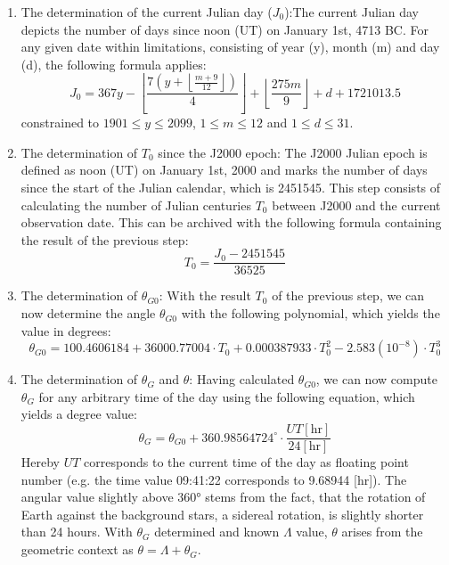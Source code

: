 \documentclass[11pt,a4paper]{article}
\begin{document}
	\begin{enumerate}
		\item The determination of the current Julian day ($J_0$):\newline The current Julian day depicts the number of days since noon (UT) on January 1st, 4713 BC. For any given date within limitations, consisting of year (y), month (m) and day (d), the following formula applies:
		\begin{equation}
			J_0 = 367y - \left\lfloor
			\frac{7\left(y + \left\lfloor \frac{m+9}{12} \right\rfloor\right)}{4}
			\right\rfloor + \left\lfloor \frac{275m}{9}\right\rfloor + d + 1721013.5
		\end{equation}
		constrained to $1901 \leq y \leq 2099$, $1 \leq m \leq 12$ and $1 \leq d \leq 31$.
		
		\item The determination of $T_0$ since the J2000 epoch:\newline
		The J2000 Julian epoch is defined as noon (UT) on January 1st, 2000 and marks the number of days since the start of the Julian calendar, which is 2451545. This step consists of calculating the number of Julian centuries $T_0$ between J2000 and the current observation date. This can be archived with the following formula containing the result of the previous step:
		\begin{equation}
			T_0 = \frac{J_0-2451545}{36525}
		\end{equation}
		
		\item The determination of $\theta_{G0}$: \newline
		With the result $T_0$ of the previous step, we can now determine the angle $\theta_{G0}$ with the following polynomial, which yields the value in degrees:
		\begin{equation}
			\theta_{G0} = 100.4606184 + 36000.77004\cdot T_0 + 0.000387933\cdot T_0^2 -2.583(10^{-8})\cdot T_0^3
		\end{equation}
		
		\item The determination of $\theta_{G}$ and $\theta$:\newline
		Having calculated $\theta_{G0}$, we can now compute $\theta_{G}$ for any arbitrary time of the day using the following equation, which yields a degree value:
		\begin{equation}
			\theta_{G} = \theta_{G0} + 360.98564724^\circ\cdot\frac{UT[\mathrm{hr}]}{24[\mathrm{hr}]}
		\end{equation}
		Hereby $UT$ corresponds to the current time of the day as floating point number (e.g. the time value 09:41:22 corresponds to 9.68944 [hr]). The angular value slightly above 360° stems from the fact, that the rotation of Earth against the background stars, a sidereal rotation, is slightly shorter than 24 hours. With $\theta_{G}$ determined and known $\Lambda$ value, $\theta$ arises from the geometric context as $\theta=\Lambda+\theta_{G}$.
	\end{enumerate}
\end{document}
